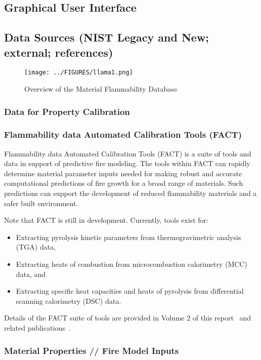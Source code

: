 \subsection{Graphical User Interface} \label{ssec:DB-GUI}


\subsection{Data Sources (NIST Legacy and New; external; references)} \label{ssec:DB-Data}


\begin{figure}[h] 
	\centering 	\texttt{[image: ../FIGURES/llama1.png]}
	\caption{Overview of the Material Flammability Database}
	\label{fig:matl-fl-db-flowchart}
\end{figure}



\subsubsection{Data for Property Calibration}
\subsubsection{Flammability data Automated Calibration Tools (FACT)}
Flammability data Automated Calibration Tools (FACT) is a suite of tools and data in support of predictive fire modeling. The tools within FACT can rapidly determine material parameter inputs needed for making robust and accurate computational predictions of fire growth for a broad range of materials. Such predictions can support the development of reduced flammability materials and a safer built environment.

Note that FACT is still in development. Currently, tools exist for:
\begin{itemize}
\item Extracting pyrolysis kinetic parameters from thermogravimetric analysis (TGA) data,
\item Extracting heats of combustion from microcombustion calorimetry (MCC) data, and
\item Extracting specific heat capacities and heats of pyrolysis from differential scanning calorimetry (DSC) data.
\end {itemize}

Details of the FACT suite of tools are provided in Volume 2 of this report~\cite{MFDBv2FACT} and related publications~\cite{bruns2021automated}.
\subsubsection{Material Properties // Fire Model Inputs}
